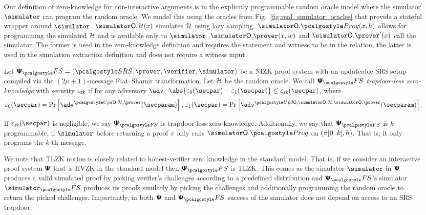  Our definition of zero-knowledge for non-interactive
arguments is in the explicitly programmable random oracle model where the simulator
$\simulator$ can program the random oracle. 
We model this using the oracles from Fig.~\ref{fig:real_simulator_oracles} that provide a stateful wrapper around $\simulator$.
$\simOH (x)$ simulates $\mathcal{H}$ using lazy sampling, $\simulator\oracleo.\prog(x, h)$ allows for programming the simulated $\mathcal{H}$ and is available only to $\simulator$. $\simOP(x, w)$ and $\simOP'(x)$ call the simulator. The former is used in the zero-knowledge definition and requires the statement and witness to be in the relation, the latter is used in the simulation extraction definition and does not require a witness input.

\begin{definition}
  \label{def:TLZK}
  Let 
  $\psfs = (\SRScer, \prover, \verifier, \simulator)$ be a NIZK proof system with an updateable SRS setup compiled via the $(2\mu + 1)$-message Fiat--Shamir transformation. Let $\mathcal{H}$ be the random oracle. 
  We call $\psfs$ \emph{trapdoor-less zero-knowledge} with security $\varepsilon_{\mathsf{zk}}$ if for any
  adversary $\adv$, $\abs{\eps_0(\secpar) - \eps_1(\secpar)} \leq \epszk(\secpar)$, where
  \begin{align*}
    \eps_0 (\secpar) = \Pr\left[ \adv^{\initU, \ro, \prover} (\secparam) \right],\,
    \eps_1 (\secpar)=  \Pr \left[\adv^{\initU, \simOH, \simOP} (\secparam) \right].
  \end{align*}
  
  If $\epszk(\secpar)$ is negligible, we say $\ps_{\fs}$ is trapdoor-less zero-knowledge. Additionally, we say that $\ps_{\fs}$ is $k$-programmable, if  $\simulator$ before returning a proof $\pi$ only calls $\simulator\oracleo.\prog$ on $(\tilde{\pi}[0..k],h)$. That is, it only programs the $k$-th message.
  \end{definition}

  
\begin{remark}
  We note that TLZK notion is closely related to honest-verifier zero knowledge in the
  standard model. That is, if we consider an interactive proof system $\bm{\mathsf{\Psi}}$
  that is HVZK in the standard model then $\proofsystem_\fs$ is TLZK. This comes as the simulator $\simulator$ in
  $\bm{\mathsf{\Psi}}$ produces a valid simulated proof by picking verifier's challenges
  according to a predefined distribution and $\proofsystem_\fs$'s simulator
  $\simulator_\fs$ produces its proofs similarly by picking the challenges and
  additionally programming the random oracle to return the picked
  challenges. Importantly, in both $\bm{\mathsf{\Psi}}$ and $\proofsystem_\fs$ success of
  the simulator does not depend on access to an SRS trapdoor.
\end{remark}

